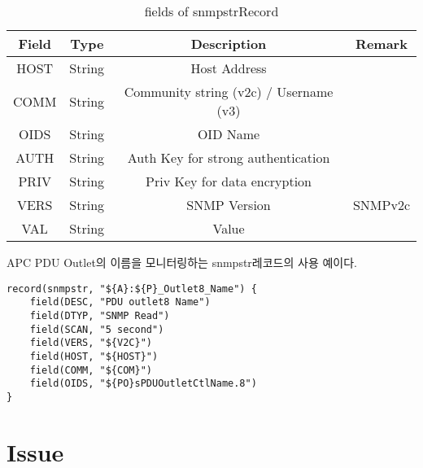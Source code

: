 \documentclass[11pt
  , a4paper
  , article
  , oneside
]{memoir}
\begin{document}
\begin{table}[!h]
\begin{center}
\begin{tabular}{cccc}\hline
Field & Type & Description & Remark\\ \hline
HOST & String & Host Address \\ \hline
COMM & String & Community string (v2c) / Username (v3) \\ \hline
OIDS & String & OID Name \\ \hline
AUTH & String & Auth Key for strong authentication \\ \hline
PRIV & String & Priv Key for data encryption\\ \hline
VERS & String & SNMP Version & SNMPv2c	 \\ \hline
VAL & String & Value \\ \hline
\end{tabular}
\caption{fields of snmpstrRecord}
\label{table:snmpstrrecord} 
\end{center}
\end{table} 

APC PDU Outlet의 이름을 모니터링하는 snmpstr레코드의 사용 예이다. 

{\scriptsize
\begin{verbatim}
record(snmpstr, "${A}:${P}_Outlet8_Name") {
    field(DESC, "PDU outlet8 Name")
    field(DTYP, "SNMP Read")
    field(SCAN, "5 second")
    field(VERS, "${V2C}")
    field(HOST, "${HOST}")
    field(COMM, "${COM}")
    field(OIDS, "${PO}sPDUOutletCtlName.8")
}
\end{verbatim}
}


\chapter{Issue}


\clearpage
\end{document}
